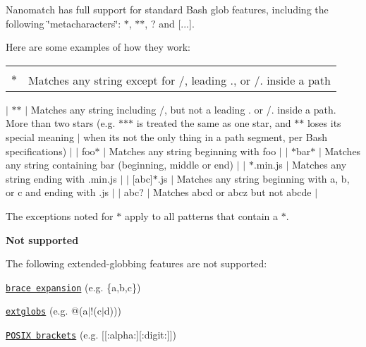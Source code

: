 Nanomatch has full support for standard Bash glob features, including the following \char`\"{}metacharacters\char`\"{}\+: {\ttfamily $\ast$}, {\ttfamily $\ast$$\ast$}, {\ttfamily ?} and {\ttfamily \mbox{[}...\mbox{]}}.

Here are some examples of how they work\+:

\tabulinesep=1mm
\begin{longtabu} spread 0pt [c]{*{2}{|X[-1]}|}
\hline
\rowcolor{\tableheadbgcolor}\\
\endfirsthead
\hline
\endfoot
\hline
\rowcolor{\tableheadbgcolor}\\
\endhead
{\ttfamily $\ast$}  &Matches any string except for {\ttfamily /}, leading {\ttfamily .}, or {\ttfamily /.} inside a path   \\
\end{longtabu}
$\vert$ {\ttfamily $\ast$$\ast$} $\vert$ Matches any string including {\ttfamily /}, but not a leading {\ttfamily .} or {\ttfamily /.} inside a path. More than two stars (e.\+g. {\ttfamily $\ast$$\ast$$\ast$} is treated the same as one star, and {\ttfamily $\ast$$\ast$} loses its special meaning $\vert$ when it\textquotesingle{}s not the only thing in a path segment, per Bash specifications) $\vert$ $\vert$ {\ttfamily foo$\ast$} $\vert$ Matches any string beginning with {\ttfamily foo} $\vert$ $\vert$ {\ttfamily $\ast$bar$\ast$} $\vert$ Matches any string containing {\ttfamily bar} (beginning, middle or end) $\vert$ $\vert$ {\ttfamily $\ast$.min.\+js} $\vert$ Matches any string ending with {\ttfamily .min.\+js} $\vert$ $\vert$ {\ttfamily \mbox{[}abc\mbox{]}$\ast$.js} $\vert$ Matches any string beginning with {\ttfamily a}, {\ttfamily b}, or {\ttfamily c} and ending with {\ttfamily .js} $\vert$ $\vert$ {\ttfamily abc?} $\vert$ Matches {\ttfamily abcd} or {\ttfamily abcz} but not {\ttfamily abcde} $\vert$

The exceptions noted for {\ttfamily $\ast$} apply to all patterns that contain a {\ttfamily $\ast$}.

{\bfseries Not supported}

The following extended-\/globbing features are not supported\+:


\begin{DoxyItemize}
\item \href{https://github.com/jonschlinkert/braces}{\tt brace expansion} (e.\+g. {\ttfamily \{a,b,c\}})
\item \href{https://github.com/jonschlinkert/extglob}{\tt extglobs} (e.\+g. {\ttfamily @(a$\vert$!(c$\vert$d))})
\item \href{https://github.com/jonschlinkert/expand-brackets}{\tt P\+O\+S\+IX brackets} (e.\+g. {\ttfamily \mbox{[}\mbox{[}\+:alpha\+:\mbox{]}\mbox{[}\+:digit\+:\mbox{]}\mbox{]}})
\end{DoxyItemize}

